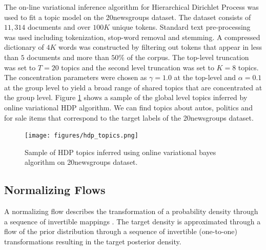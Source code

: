 The on-line variational inference algorithm for Hierarchical Dirichlet Process was used to fit a topic model on the 20newsgroups dataset. The dataset consists of $11,314$ documents and over $100K$ unique tokens. Standard text pre-processing was used including tokenization, stop-word removal and stemming. A compressed dictionary of $4K$ words was constructed by filtering out tokens that appear in less than $5$ documents and more than $50\%$ of the corpus. The top-level truncation was set to $T=20$ topics and the second level truncation was set to $K=8$ topics. The concentration parameters were chosen as $\gamma = 1.0$ at the top-level and $\alpha=0.1$ at the group level to yield a broad range of shared topics that are concentrated at the group level. Figure \ref{fig:hdp_topics_vb} shows a sample of the global level topics inferred by online variational HDP algorithm. We can find topics about autos, politics and for sale items that correspond to the target labels of the 20newsgroups dataset.

\begin{figure}[thpb]
    \centering
    \texttt{[image: figures/hdp\_topics.png]}
    \caption{Sample of HDP topics inferred using online variational bayes algorithm on 20newsgroups dataset.}
    \label{fig:hdp_topics_vb}
\end{figure}

\subsection{Normalizing Flows}

A normalizing flow describes the transformation of a probability density through a sequence of invertible mappings \cite{Rezende2015}. The target density is approximated through a flow of the prior distribution through a sequence of invertible (one-to-one) transformations resulting in the target posterior density.\\

